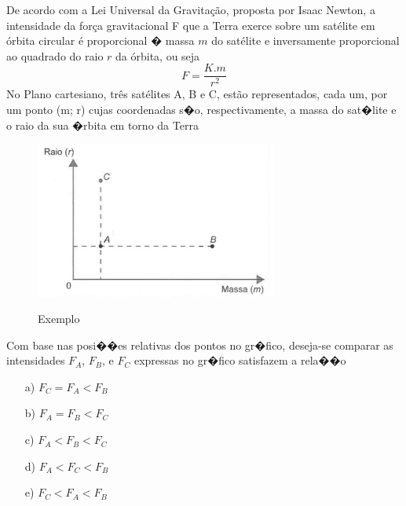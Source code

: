 De acordo com a Lei Universal da Gravitação, proposta por Isaac Newton, 
a intensidade da força gravitacional F que a Terra exerce sobre um satélite em 
órbita circular é proporcional � massa $m$ do satélite e inversamente proporcional ao quadrado do raio $r$ da órbita, ou seja
\begin{equation*}
F=\frac{K.m}{r^2}
\end{equation*}
No Plano cartesiano, três satélites A, B e C, estão representados, cada um, por um ponto (m; r) cujas coordenadas s�o, respectivamente, a massa do sat�lite e o raio da sua �rbita em torno da Terra
\begin{figure}[h]
\caption{Exemplo}
\centering
\includegraphics[width=8cm]{../figuras/q136-2018.png}
\label{Figura:1}
\end{figure}
Com base nas posi��es relativas dos pontos no gr�fico, deseja-se comparar as intensidades $F_A$, $F_B$, e $F_C$ expressas no gr�fico satisfazem a rela��o
\begin{enumerate}
\item[a)] $F_C=F_A < F_B$
\item[b)]$F_A=F_B < F_C$
\item[c)]$F_A<F_B < F_C$
\item[d)]$F_A<F_C < F_B$
\item[e)]$F_C<F_A < F_B$
\end{enumerate}
